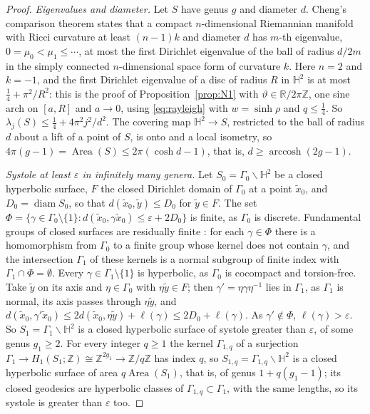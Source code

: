 \documentclass[pdflatex,sn-mathphys-num]{sn-jnl}
\theoremstyle{thmstyleone}%
\theoremstyle{thmstylethree}%
\newcommand{\Area}{\operatorname{Area}}
\newcommand{\diam}{\operatorname{diam}}
\newcommand{\R}{\mathbb{R}}
\newcommand{\Z}{\mathbb{Z}}
\newcommand{\Hb}{\mathbb{H}^2}
\begin{document}
\begin{proof}
\emph{Eigenvalues and diameter.} Let $S$ have genus $g$ and diameter $d$. Cheng's comparison theorem \cite[Thm~2.1]{cheng1975} states that a compact $n$-dimensional Riemannian manifold with Ricci curvature at least $(n-1)k$ and diameter $d$ has $m$-th eigenvalue, $0=\mu_0<\mu_1\le\cdots$, at most the first Dirichlet eigenvalue of the ball of radius $d/2m$ in the simply connected $n$-dimensional space form of curvature $k$. Here $n=2$ and $k=-1$, and the first Dirichlet eigenvalue of a disc of radius $R$ in $\Hb$ is at most $\frac14+\pi^2/R^2$: this is the proof of Proposition~\ref{prop:N1} with $\vartheta\in\R/2\pi\Z$, one sine arch on $[a,R]$ and $a\to0$, using \eqref{eq:rayleigh} with $w=\sinh\rho$ and $q\le\frac14$. So $\lambda_j(S)\le\frac14+4\pi^2j^2/d^2$. The covering map $\Hb\to S$, restricted to the ball of radius $d$ about a lift of a point of $S$, is onto and a local isometry, so $4\pi(g-1)=\Area(S)\le2\pi(\cosh d-1)$, that is, $d\ge\operatorname{arccosh}(2g-1)$.

\emph{Systole at least $\varepsilon$ in infinitely many genera.} Let $S_0=\Gamma_0\backslash\Hb$ be a closed hyperbolic surface, $F$ the closed Dirichlet domain of $\Gamma_0$ at a point $\tilde x_0$, and $D_0=\diam S_0$, so that $d(\tilde x_0,\tilde y)\le D_0$ for $\tilde y\in F$. The set $\Phi=\{\gamma\in\Gamma_0\setminus\{1\}:d(\tilde x_0,\gamma\tilde x_0)\le\varepsilon+2D_0\}$ is finite, as $\Gamma_0$ is discrete. Fundamental groups of closed surfaces are residually finite \cite{hempel1972}: for each $\gamma\in\Phi$ there is a homomorphism from $\Gamma_0$ to a finite group whose kernel does not contain $\gamma$, and the intersection $\Gamma_1$ of these kernels is a normal subgroup of finite index with $\Gamma_1\cap\Phi=\emptyset$. Every $\gamma\in\Gamma_1\setminus\{1\}$ is hyperbolic, as $\Gamma_0$ is cocompact and torsion-free. Take $\tilde y$ on its axis and $\eta\in\Gamma_0$ with $\eta\tilde y\in F$; then $\gamma'=\eta\gamma\eta^{-1}$ lies in $\Gamma_1$, as $\Gamma_1$ is normal, its axis passes through $\eta\tilde y$, and $d(\tilde x_0,\gamma'\tilde x_0)\le2d(\tilde x_0,\eta\tilde y)+\ell(\gamma)\le2D_0+\ell(\gamma)$. As $\gamma'\notin\Phi$, $\ell(\gamma)>\varepsilon$. So $S_1=\Gamma_1\backslash\Hb$ is a closed hyperbolic surface of systole greater than $\varepsilon$, of some genus $g_1\ge2$. For every integer $q\ge1$ the kernel $\Gamma_{1,q}$ of a surjection $\Gamma_1\to H_1(S_1;\Z)\cong\Z^{2g_1}\to\Z/q\Z$ has index $q$, so $S_{1,q}=\Gamma_{1,q}\backslash\Hb$ is a closed hyperbolic surface of area $q\Area(S_1)$, that is, of genus $1+q(g_1-1)$; its closed geodesics are hyperbolic classes of $\Gamma_{1,q}\subset\Gamma_1$, with the same lengths, so its systole is greater than $\varepsilon$ too.


\end{proof}
\end{document}
